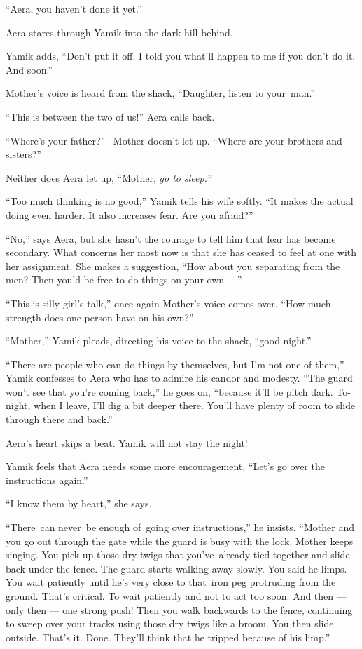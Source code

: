 \documentclass[twoside,11pt]{book}
\begin{document}
{}``Aera, you haven't done it yet.''

Aera stares through Yamik into the dark hill behind.

Yamik adds, {}``Don't put it off. I told you what'll happen to me if you don't do it. And soon.''

Mother's voice is heard from the shack, ``Daughter, listen to your~man.''

``This is between the two of us!'' Aera calls back.

{}``Where's your father?'' ~Mother doesn't let up. ``Where{ }are your
brothers and sisters?''

Neither does Aera let up, ``Mother, \textit{go to sleep.}{}''

{}``Too much thinking is no good,'' Yamik tells his wife softly. ``It makes the actual doing
even harder. It also increases fear. Are you afraid?''

{}``No,'' says Aera, but she hasn't the courage to tell him that fear has become secondary. What concerns her most now
is that she has ceased to feel at one with her assignment. She makes a suggestion, ``How about you separating from the
men?  Then you'd be free to do things on your own ---''

{}``This is silly girl's talk,'' once again Mother's voice comes over. ``How much strength
does one person have on his own?''

``Mother,'' Yamik pleads, directing his voice to the shack, ``good night.''

{}``There are people who can do things by themselves, but I'm not one of
them,{}'' Yamik{ }confesses to Aera who has to admire his candor and
modesty. {}``The guard won't see that you're coming back,{}'' he goes on, ``because it'll be pitch dark. To-night,
when I leave, I'll dig a bit deeper there. You'll have plenty of room to slide through there and back.''

Aera's heart skips a beat. Yamik will not stay the night!

Yamik feels that Aera needs some more encouragement, ``Let's go over the instructions again.''

{}``I know them by heart,'' she says.

{}``There~can never~be enough of~going over instructions,'' he insists. ``Mother and you go
out through the gate while the guard is busy with the lock. Mother keeps singing. You pick up those dry twigs that
you've~already tied together and slide back under the fence. The guard starts walking away slowly. You said he limps.
You wait patiently until he's very close to that~iron peg protruding from the ground. That's critical. To wait
patiently and not to act too soon. And then ---  only then --- one strong push! Then you walk backwards to the fence,
continuing to sweep over your tracks using those dry twigs{ }like a broom. You
then slide outside. That's it. Done. They'll think that he tripped{ }because
of his limp.''
\end{document}
